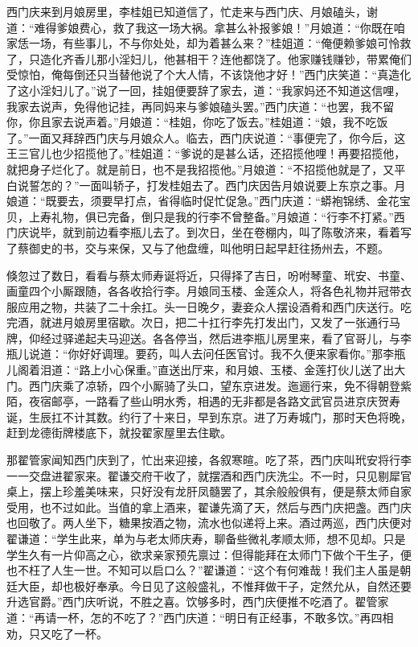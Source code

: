 西门庆来到月娘房里，李桂姐已知道信了，忙走来与西门庆、月娘磕头，谢道：“难得爹娘费心，救了我这一场大祸。拿甚么补报爹娘！”月娘道：“你既在咱家恁一场，有些事儿，不与你处处，却为着甚么来？”桂姐道：“俺便赖爹娘可怜救了，只造化齐香儿那小淫妇儿，他甚相干？连他都饶了。他家赚钱赚钞，带累俺们受惊怕，俺每倒还只当替他说了个大人情，不该饶他才好！”西门庆笑道：“真造化了这小淫妇儿了。”说了一回，挂姐便要辞了家去，道：“我家妈还不知道这信哩，我家去说声，免得他记挂，再同妈来与爹娘磕头罢。”西门庆道：“也罢，我不留你，你且家去说声着。”月娘道：“桂姐，你吃了饭去。”桂姐道：“娘，我不吃饭了。”一面又拜辞西门庆与月娘众人。临去，西门庆说道：“事便完了，你今后，这王三官儿也少招揽他了。”桂姐道：“爹说的是甚么话，还招揽他哩！再要招揽他，就把身子烂化了。就是前日，也不是我招揽他。”月娘道：“不招揽他就是了，又平白说誓怎的？”一面叫轿子，打发桂姐去了。西门庆因告月娘说要上东京之事。月娘道：“既要去，须要早打点，省得临时促忙促急。”西门庆道：“蟒袍锦绣、金花宝贝，上寿礼物，俱已完备，倒只是我的行李不曾整备。”月娘道：“行李不打紧。”西门庆说毕，就到前边看李瓶儿去了。到次日，坐在卷棚内，叫了陈敬济来，看着写了蔡御史的书，交与来保，又与了他盘缠，叫他明日起早赶往扬州去，不题。

倏忽过了数日，看看与蔡太师寿诞将近，只得择了吉日，吩咐琴童、玳安、书童、画童四个小厮跟随，各各收拾行李。月娘同玉楼、金莲众人，将各色礼物并冠带衣服应用之物，共装了二十余扛。头一日晚夕，妻妾众人摆设酒肴和西门庆送行。吃完酒，就进月娘房里宿歇。次日，把二十扛行李先打发出门，又发了一张通行马牌，仰经过驿递起夫马迎送。各各停当，然后进李瓶儿房里来，看了官哥儿，与李瓶儿说道：“你好好调理。要药，叫人去问任医官讨。我不久便来家看你。”那李瓶儿阁着泪道：“路上小心保重。”直送出厅来，和月娘、玉楼、金莲打伙儿送了出大门。西门庆乘了凉轿，四个小厮骑了头口，望东京进发。迤逦行来，免不得朝登紫陌，夜宿邮亭，一路看了些山明水秀，相遇的无非都是各路文武官员进京庆贺寿诞，生辰扛不计其数。约行了十来日，早到东京。进了万寿城门，那时天色将晚，赶到龙德街牌楼底下，就投翟家屋里去住歇。

那翟管家闻知西门庆到了，忙出来迎接，各叙寒暄。吃了茶，西门庆叫玳安将行李一一交盘进翟家来。翟谦交府干收了，就摆酒和西门庆洗尘。不一时，只见剔犀官桌上，摆上珍羞美味来，只好没有龙肝凤髓罢了，其余般般俱有，便是蔡太师自家受用，也不过如此。当值的拿上酒来，翟谦先滴了天，然后与西门庆把盏。西门庆也回敬了。两人坐下，糖果按酒之物，流水也似递将上来。酒过两巡，西门庆便对翟谦道：“学生此来，单为与老太师庆寿，聊备些微礼孝顺太师，想不见却。只是学生久有一片仰高之心，欲求亲家预先禀过：但得能拜在太师门下做个干生子，便也不枉了人生一世。不知可以启口么？”翟谦道：“这个有何难哉！我们主人虽是朝廷大臣，却也极好奉承。今日见了这般盛礼，不惟拜做干子，定然允从，自然还要升选官爵。”西门庆听说，不胜之喜。饮够多时，西门庆便推不吃酒了。翟管家道：“再请一杯，怎的不吃了？”西门庆道：“明日有正经事，不敢多饮。”再四相劝，只又吃了一杯。


